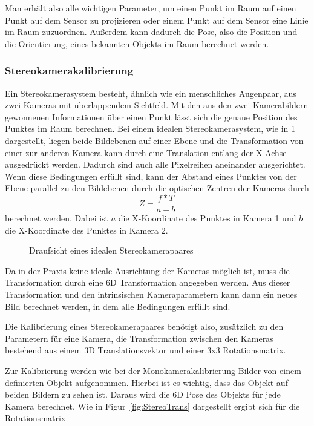 Man erhält also alle wichtigen Parameter, um einen Punkt im Raum auf einen Punkt auf dem Sensor
zu projizieren oder einem Punkt auf dem Sensor eine Linie im Raum zuzuordnen.
Außerdem kann dadurch die Pose, also die Position und die Orientierung, eines bekannten Objekts im Raum berechnet
werden. 


\subsubsection{Stereokamerakalibrierung} %
\label{sssec:Stereokamerakalibrierung} Ein Stereokamerasystem besteht, ähnlich
wie ein menschliches Augenpaar, aus zwei Kameras mit überlappendem Sichtfeld.
Mit den aus den zwei Kamerabildern gewonnenen Informationen über einen Punkt
lässt sich die genaue Position des Punktes im Raum berechnen. Bei einem idealen
Stereokamerasystem, wie in \ref{fig:DraufStereo} dargestellt, liegen beide
Bildebenen auf einer Ebene und die Transformation von einer zur anderen Kamera
kann durch eine Translation entlang der X-Achse ausgedrückt werden. Dadurch
sind auch alle Pixelreihen aneinander ausgerichtet. Wenn diese Bedingungen erfüllt sind, kann der Abstand
eines Punktes von der Ebene parallel zu den Bildebenen durch die optischen
Zentren der Kameras durch \begin{equation} Z=\frac{f*T}{a-b} \end{equation}
berechnet werden. Dabei ist $a$ die X-Koordinate des Punktes in Kamera 1 und 
$b$ die X-Koordinate des Punktes in Kamera 2.


\begin{figure}[htpb] \centering \def\svgwidth{\textwidth}
   \caption{Draufsicht eines idealen
  Stereokamerapaares} \label{fig:DraufStereo} \end{figure}

Da in der Praxis keine ideale Ausrichtung der Kameras möglich ist, muss die
Transformation durch eine 6D Transformation angegeben werden. Aus dieser
Transformation und den intrinsischen Kameraparametern kann dann ein neues Bild
berechnet werden, in dem alle Bedingungen erfüllt sind.

Die Kalibrierung eines Stereokamerapaares benötigt also, zusätzlich zu den
Parametern für eine Kamera, die Transformation zwischen den Kameras bestehend
aus einem 3D Translationsvektor und einer 3x3 Rotationsmatrix.

Zur Kalibrierung werden wie bei der Monokamerakalibrierung Bilder von einem
definierten Objekt aufgenommen. Hierbei ist es wichtig, dass das Objekt auf
beiden Bildern zu sehen ist. Daraus wird die 6D Pose des Objekts für jede
Kamera berechnet. Wie in Figur~\ref{fig:StereoTrans} dargestellt ergibt sich
für die Rotationsmatrix


